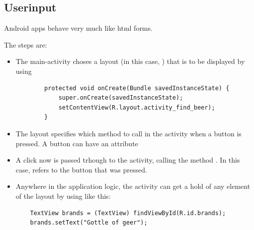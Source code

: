 \subsection{Userinput}
Android apps behave very much like html forms. 

The steps are: 
\begin{itemize}
    \item The main-activity choses a layout (in this case, ) that is to be displayed by using 
    \begin{lstlisting}
        protected void onCreate(Bundle savedInstanceState) {
            super.onCreate(savedInstanceState);
            setContentView(R.layout.activity_find_beer);
        }
    \end{lstlisting}
    
    \item The layout specifies which method to call in the activity when a button is pressed. A button can have an attribute 
    
    \item A click now is passed trhough to the activity, calling the method . In this case,  refers to the button that was pressed. 
    
    \item Anywhere in the application logic, the activity can get a hold of any element of the layout by using  like this: 
    \begin{lstlisting}
    TextView brands = (TextView) findViewById(R.id.brands);
    brands.setText("Gottle of geer");
    \end{lstlisting}
\end{itemize}




